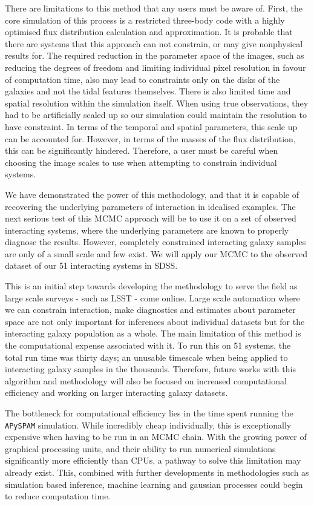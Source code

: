 There are limitations to this method that any users must be aware of. First, the core simulation of this process is a restricted three-body code with a highly optimised flux distribution calculation and approximation. It is probable that there are systems that this approach can not constrain, or may give nonphysical results for. The required reduction in the parameter space of the images, such as reducing the degrees of freedom and limiting individual pixel resolution in favour of computation time, also may lead to constraints only on the disks of the galaxies and not the tidal features themselves. There is also limited time and spatial resolution within the simulation itself. When using true observations, they had to be artificially scaled up so our simulation could maintain the resolution to have constraint. In terms of the temporal and spatial parameters, this scale up can be accounted for. However, in terms of the masses of the flux distribution, this can be significantly hindered. Therefore, a user must be careful when choosing the image scales to use when attempting to constrain individual systems. 

We have demonstrated the power of this methodology, and that it is capable of recovering the underlying parameters of interaction in idealised examples. The next serious test of this MCMC approach will be to use it on a set of observed interacting systems, where the underlying parameters are known to properly diagnose the results. However, completely constrained interacting galaxy samples are only of a small scale and few exist. We will apply our MCMC to the observed dataset of our 51 interacting systems in SDSS.

This is an initial step towards developing the methodology to serve the field as large scale surveys - such as LSST - come online. Large scale automation where we can constrain interaction, make diagnostics and estimates about parameter space are not only important for inferences about individual datasets but for the interacting galaxy population as a whole. The main limitation of this method is the computational expense associated with it. To run this on 51 systems, the total run time was thirty days; an unusable timescale when being applied to interacting galaxy samples in the thousands. Therefore, future works with this algorithm and methodology will also be focused on increased computational efficiency and working on larger interacting galaxy datasets. 

The bottleneck for computational efficiency lies in the time spent running the \texttt{APySPAM} simulation. While incredibly cheap individually, this is exceptionally expensive when having to be run in an MCMC chain. With the growing power of graphical processing units, and their ability to run numerical simulations significantly more efficiently than CPUs, a pathway to solve this limitation may already exist. This, combined with further developments in methodologies such as simulation based inference, machine learning and gaussian processes could begin to reduce computation time.
